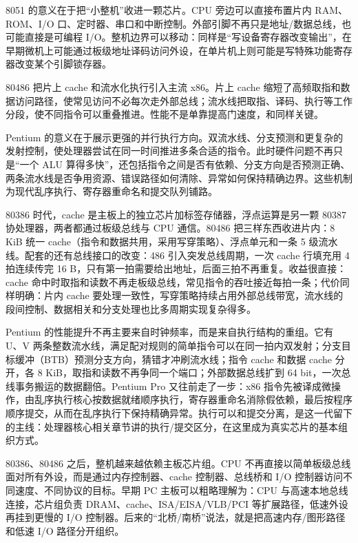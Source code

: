 8051 的意义在于把“小整机”收进一颗芯片。CPU 旁边可以直接布置片内 RAM、ROM、I/O 口、定时器、串口和中断控制。外部引脚不再只是地址/数据总线，也可能直接是可编程 I/O。整机边界可以移动：同样是“写设备寄存器改变输出”，在早期微机上可能通过板级地址译码访问外设，在单片机上则可能是写特殊功能寄存器改变某个引脚锁存器。

80486 把片上 cache 和流水化执行引入主流 x86。片上 cache 缩短了高频取指和数据访问路径，使常见访问不必每次走外部总线；流水线把取指、译码、执行等工作分段，使不同指令可以重叠推进。性能不是单靠提高门速度，和同样关键。

Pentium 的意义在于展示更强的并行执行方向。双流水线、分支预测和更复杂的发射控制，使处理器尝试在同一时间推进多条合适的指令。此时硬件问题不再只是“一个 ALU 算得多快”，还包括指令之间是否有依赖、分支方向是否预测正确、两条流水线是否争用资源、错误路径如何清除、异常如何保持精确边界。这些机制为现代乱序执行、寄存器重命名和提交队列铺路。

80386 时代，cache 是主板上的独立芯片加标签存储器，浮点运算是另一颗 80387 协处理器，两者都通过板级总线与 CPU 通信。80486 把三样东西收进片内：8 KiB 统一 cache（指令和数据共用，采用写穿策略）、浮点单元和一条 5 级流水线。配套的还有总线接口的改变：486 引入突发总线周期，一次 cache 行填充用 4 拍连续传完 16 B，只有第一拍需要给出地址，后面三拍不再重复。收益很直接：cache 命中时取指和读数不再走板级总线，常见指令的吞吐接近每拍一条；代价同样明确：片内 cache 要处理一致性，写穿策略持续占用外部总线带宽，流水线的段间控制、数据相关和分支处理也比多周期实现复杂得多。

Pentium 的性能提升不再主要来自时钟频率，而是来自执行结构的重组。它有 U、V 两条整数流水线，满足配对规则的简单指令可以在同一拍内双发射；分支目标缓冲（BTB）预测分支方向，猜错才冲刷流水线；指令 cache 和数据 cache 分开，各 8 KiB，取指和读数不再争同一个端口；外部数据总线扩到 64 bit，一次总线事务搬运的数据翻倍。Pentium Pro 又往前走了一步：x86 指令先被译成微操作，由乱序执行核心按数据就绪顺序执行，寄存器重命名消除假依赖，最后按程序顺序提交，从而在乱序执行下保持精确异常。执行可以和提交分离，是这一代留下的主线：处理器核心相关章节讲的执行/提交区分，在这里成为真实芯片的基本组织方式。

80386、80486 之后，整机越来越依赖主板芯片组。CPU 不再直接以简单板级总线面对所有外设，而是通过内存控制器、cache 控制器、总线桥和 I/O 控制器访问不同速度、不同协议的目标。早期 PC 主板可以粗略理解为：CPU 与高速本地总线连接，芯片组负责 DRAM、cache、ISA/EISA/VLB/PCI 等扩展路径，低速外设再挂到更慢的 I/O 控制器。后来的“北桥/南桥”说法，就是把高速内存/图形路径和低速 I/O 路径分开组织。

